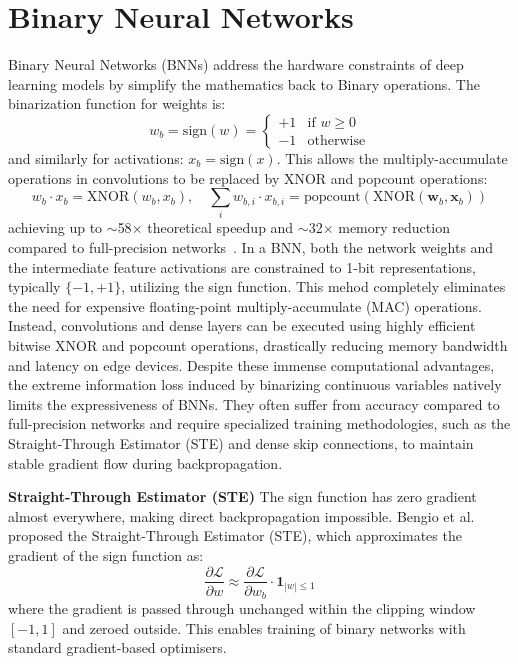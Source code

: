 \documentclass[a4paper]{report}
\begin{document}
\section{Binary Neural Networks}
\label{sec:bnn}
Binary Neural Networks (BNNs) address the hardware constraints of deep learning models by simplify the mathematics back to Binary operations. The binarization function for weights is:
\begin{equation}
    w_b = \text{sign}(w) = \begin{cases} +1 & \text{if } w \geq 0 \\ -1 & \text{otherwise} \end{cases}
\end{equation}
and similarly for activations: $x_b = \text{sign}(x)$. This allows the multiply-accumulate operations in convolutions to be replaced by XNOR and popcount operations:
\begin{equation}
    w_b \cdot x_b = \text{XNOR}(w_b, x_b), \quad \sum_i w_{b,i} \cdot x_{b,i} = \text{popcount}(\text{XNOR}(\mathbf{w}_b, \mathbf{x}_b))
\end{equation}
achieving up to $\sim$58$\times$ theoretical speedup and $\sim$32$\times$ memory reduction compared to full-precision networks~\cite{rastegari2016xnor}.
In a BNN, both the network weights and the intermediate feature activations are constrained to 1-bit representations, typically $\{-1, +1\}$, utilizing the sign function. This mehod completely eliminates the need for expensive floating-point multiply-accumulate (MAC) operations. Instead, convolutions and dense layers can be executed using highly efficient bitwise XNOR and popcount operations, drastically reducing memory bandwidth and latency on edge devices. Despite these immense computational advantages, the extreme information loss induced by binarizing continuous variables natively limits the expressiveness of BNNs. They often suffer from accuracy compared to full-precision networks and require specialized training methodologies, such as the Straight-Through Estimator (STE) and dense skip connections, to maintain stable gradient flow during backpropagation.


\textbf{Straight-Through Estimator (STE)}
The sign function has zero gradient almost everywhere, making direct backpropagation impossible. Bengio et al.~\cite{bengio2013ste} proposed the Straight-Through Estimator (STE), which approximates the gradient of the sign function as:
\begin{equation}
    \frac{\partial \mathcal{L}}{\partial w} \approx \frac{\partial \mathcal{L}}{\partial w_b} \cdot \mathbf{1}_{|w| \leq 1}
\end{equation}
where the gradient is passed through unchanged within the clipping window $[-1, 1]$ and zeroed outside. This enables training of binary networks with standard gradient-based optimisers.
\end{document}
